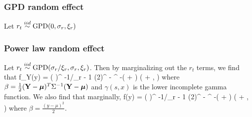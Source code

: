 \documentclass[11pt]{article}
\begin{document}
\subsubsection{GPD random effect}
Let $r_t \stackrel{iid}{\sim} \mbox{GPD}(0, \sigma_r, \xi_r)$

\subsubsection{Power law random effect}
Let $r_t \stackrel{iid}{\sim} \mbox{GPD}(\sigma_r/\xi_r, \sigma_r, \xi_r)$. Then by marginalizing out the $r_t$ terms, we find that 
\beq
	f_Y(y) = \left(  \right)^{ -1/\xi_r - 1 } (2\pi)^{ - }\beta^{ -\left(  +  \right) } \gamma\left(  + ,  \beta \right)
\eeq
where $\beta = \frac{ 1 }{ 2 } (\mbox{\bf Y} - \mbox{\boldmath $\mu$})^T \Sigma^{-1} (\mbox{\bf Y} - \mbox{\boldmath $\mu$})$ and $\gamma(s, x)$ is the lower incomplete gamma function. 
We also find that marginally, 
\beqn
	f(y) = \left(  \right)^{ -1/\xi_r - 1 } (2\pi)^{ - }\beta^{ -\left(  +  \right) } \gamma\left(  + ,  \beta \right)
\eeqn
where $\beta = \frac{ (y - \mu)^2 }{ 2 }$.
\end{document}
